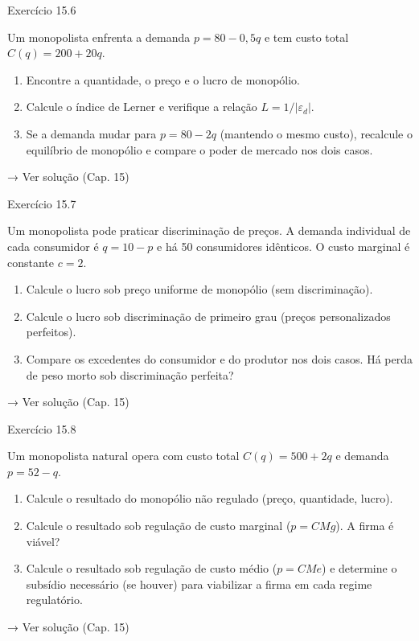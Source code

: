 \documentclass[11pt,twoside,openright]{book}
\begin{document}
\begin{exresolvidobox}{Exercício 15.6}

Um monopolista enfrenta a demanda \(p = 80 - 0{,}5q\) e tem custo total
\(C(q) = 200 + 20q\).

\begin{enumerate}
\def\labelenumi{\alph{enumi})}
\item
  Encontre a quantidade, o preço e o lucro de monopólio.
\item
  Calcule o índice de Lerner e verifique a relação
  \(L = 1/|\varepsilon_d|\).
\item
  Se a demanda mudar para \(p = 80 - 2q\) (mantendo o mesmo custo),
  recalcule o equilíbrio de monopólio e compare o poder de mercado nos
  dois casos.
\end{enumerate}

→ Ver solução (Cap. 15)

\end{exresolvidobox}

\begin{exresolvidobox}{Exercício 15.7}

Um monopolista pode praticar discriminação de preços. A demanda
individual de cada consumidor é \(q = 10 - p\) e há 50 consumidores
idênticos. O custo marginal é constante \(c = 2\).

\begin{enumerate}
\def\labelenumi{\alph{enumi})}
\item
  Calcule o lucro sob preço uniforme de monopólio (sem discriminação).
\item
  Calcule o lucro sob discriminação de primeiro grau (preços
  personalizados perfeitos).
\item
  Compare os excedentes do consumidor e do produtor nos dois casos. Há
  perda de peso morto sob discriminação perfeita?
\end{enumerate}

→ Ver solução (Cap. 15)

\end{exresolvidobox}

\begin{exresolvidobox}{Exercício 15.8}

Um monopolista natural opera com custo total \(C(q) = 500 + 2q\) e
demanda \(p = 52 - q\).

\begin{enumerate}
\def\labelenumi{\alph{enumi})}
\item
  Calcule o resultado do monopólio não regulado (preço, quantidade,
  lucro).
\item
  Calcule o resultado sob regulação de custo marginal (\(p = CMg\)). A
  firma é viável?
\item
  Calcule o resultado sob regulação de custo médio (\(p = CMe\)) e
  determine o subsídio necessário (se houver) para viabilizar a firma em
  cada regime regulatório.
\end{enumerate}

→ Ver solução (Cap. 15)

\end{exresolvidobox}
\end{document}
